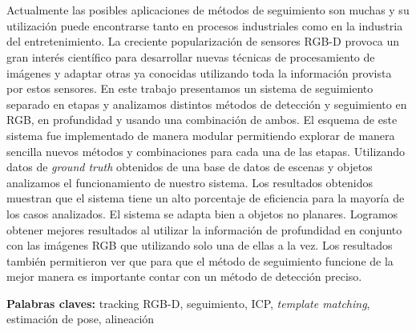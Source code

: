 \chapter*{\runtitulo}

\noindent Actualmente las posibles aplicaciones de métodos de seguimiento son muchas y su utilización puede encontrarse tanto en procesos industriales como en la industria del entretenimiento. La creciente popularización de sensores RGB-D provoca un gran interés científico para desarrollar nuevas técnicas de procesamiento de imágenes y adaptar otras ya conocidas utilizando toda la información provista por estos sensores. En este trabajo presentamos un sistema de seguimiento separado en etapas y analizamos distintos métodos de detección y seguimiento en RGB, en profundidad y usando una combinación de ambos. El esquema de este sistema fue implementado de manera modular permitiendo explorar de manera sencilla nuevos métodos y combinaciones para cada una de las etapas. Utilizando datos de \textit{ground truth} obtenidos de una base de datos de escenas y objetos analizamos el funcionamiento de nuestro sistema. Los resultados obtenidos muestran que el sistema tiene un alto porcentaje de eficiencia para la mayoría de los casos analizados. El sistema se adapta bien a objetos no planares. Logramos obtener mejores resultados al utilizar la información de profundidad en conjunto con las imágenes RGB que utilizando solo una de ellas a la vez. Los resultados también permitieron ver que para que el método de seguimiento funcione de la mejor manera es importante contar con un método de detección preciso.



\bigskip

\noindent\textbf{Palabras claves:} tracking RGB-D, seguimiento, ICP, \textit{template matching}, estimación de pose, alineación
